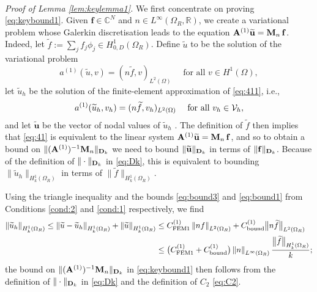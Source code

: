 \documentclass[10pt]{article}%
\newenvironment{proof}[1][Proof]{\noindent \emph{#1.} }
{\hfill \ \rule{0.5em}{0.5em}}
\numberwithin{equation}{section}
\newcommand{\beq}{\begin{equation}}
\newcommand{\eeq}{\end{equation}}
\newcommand{\beqs}{\begin{equation*}}
\newcommand{\eeqs}{\end{equation*}}
\newcommand{\bpf}{\begin{proof}}
\newcommand{\cV}{{\cal V}}
\newcommand{\bu}{\mathbf{u}}
\newcommand{\bff}{\mathbf{f}}
\newcommand{\eps}{\varepsilon}
\newcommand{\Rea}{\mathbb{R}}
\newcommand{\Com}{\mathbb{C}}
\newcommand{\OR}{{\Omega_R}}
\newcommand{\HoDkk}{{H^1_{k}(\domain_R)}}
\newcommand*{\N}[1]{\left\|#1\right\|}
\newcommand{\domain}{\Omega}
\newcommand{\matrixD}{{\bf D}}
\newcommand{\matrixM}{{\bf M}}
\newcommand{\matrixAo}{{\bf A}^{(1)}}
\newcommand{\tu}{\widetilde{u}}
\newcommand{\tbu}{\widetilde{\bu}}
\begin{document}
\

\bpf[Proof of Lemma \ref{lem:keylemma1}]
We first concentrate on proving \eqref{eq:keybound1}.
Given $\bff \in \Com^N$ and $n\in L^\infty(\OR,\Rea)$, we create a variational problem whose Galerkin discretisation leads to the equation $\matrixAo \tbu = \matrixM_n\,\bff$.
Indeed, let $\widetilde{f} := \sum_j f_j \phi_j\in H^1_{0,D}(\OR)$. Define $\widetilde{u}$ to be the solution of the variational problem 
\beq\label{eq:411}
a^{(1)}(\widetilde{u},v)= (n\widetilde{f},v)_{L^2(\Omega)} \quad\text{ for all } v\in H^1(\Omega),
\eeq
let $\tu_h$ be the solution of the finite-element approximation of \eqref{eq:411}, i.e.,
\beq\label{eq:41}
a^{(1)}(\tu_h,v_h)= (n\widetilde{f},v_h)_{L^2(\Omega)} \quad\text{ for all } v_h\in \cV_h,
\eeq
and let $\tbu$ be the vector of nodal values of $\tu_h$ . The definition of $\widetilde{f}$ then implies that \eqref{eq:41} is equivalent to the linear system $\matrixAo \tbu = \matrixM_{n}\,\bff$, and so to obtain a bound on $\|(\matrixAo)^{-1}\matrixM_n\|_{\matrixD_k}$ we need to bound $\|\tbu\|_{\matrixD_k}$ in terms of $\|\bff\|_{\matrixD_k}$. Because of the definition 
of $\|\cdot\|_{\matrixD_k}$ in \eqref{eq:Dk}, this is equivalent to bounding $\|\tu_h\|_{\HoDkk}$ in terms of $\|\widetilde{f}\|_{\HoDkk}$.


Using %
the triangle inequality and the bounds \eqref{eq:bound3} and \eqref{eq:bound1} from Conditions \ref{cond:2} and \ref{cond:1} respectively, we find
\begin{align}
\N{\tu_h}_{\HoDkk} \leq
\N{\tu-\tu_h}_{\HoDkk} + \N{\tu}_{\HoDkk} \label{eq:mainevent1}
& \leq C^{(1)}_{\rm FEM1}\N{nf}_{L^2(\OR)} + C^{(1)}_{\rm bound}\big\|n\widetilde{f}\big\|_{L^2(\OR)} \\ \nonumber
& \leq\big(C^{(1)}_{\rm FEM1}+  C^{(1)}_{\rm bound}\big)\N{n}_{L^\infty(\OR)}\frac{\big\|\widetilde{f}\big\|_{\HoDkk}}{k};
\end{align}
the bound on $\|(\matrixAo)^{-1}\matrixM_n\|_{\matrixD_k}$ in \eqref{eq:keybound1} then follows from the definition of $\|\cdot\|_{\matrixD_k}$ in \eqref{eq:Dk} and the definition of $C_2$ \eqref{eq:C2}.
\end{document}
